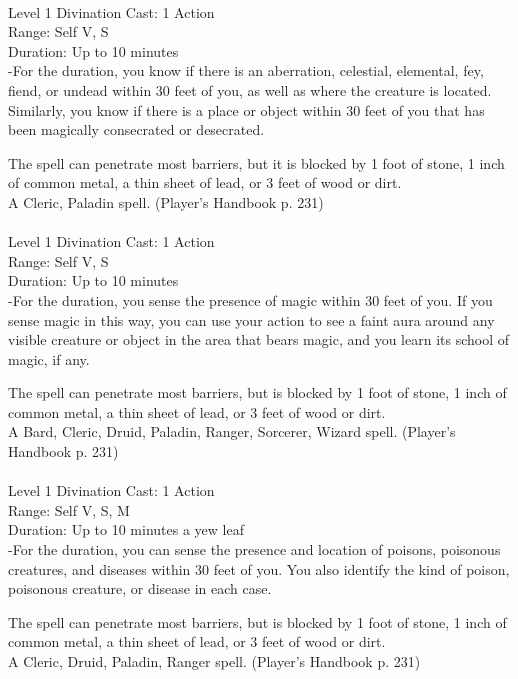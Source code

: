 \documentclass[10pt,twocolumn]{report}
\begin{document}
 \\
Level 1 \quad Divination \quad Cast: 1 Action\\
Range: Self \quad V, S\\
Duration: Up to 10 minutes \quad \\
-For the duration, you know if there is an aberration, celestial, elemental, fey, fiend, or undead within 30 feet of you, as well as where the creature is located. Similarly, you know if there is a place or object within 30 feet of you that has been magically consecrated or desecrated. 

The spell can penetrate most barriers, but it is blocked by 1 foot of stone, 1 inch of common metal, a thin sheet of lead, or 3 feet of wood or dirt.\\
A Cleric, Paladin spell. (Player's Handbook p. 231) \\


 \\
Level 1 \quad Divination \quad Cast: 1 Action\\
Range: Self \quad V, S\\
Duration: Up to 10 minutes \quad \\
-For the duration, you sense the presence of magic within 30 feet of you. If you sense magic in this way, you can use your action to see a faint aura around any visible creature or object in the area that bears magic, and you learn its school of magic, if any. 

The spell can penetrate most barriers, but is blocked by 1 foot of stone, 1 inch of common metal, a thin sheet of lead, or 3 feet of wood or dirt.\\
A Bard, Cleric, Druid, Paladin, Ranger, Sorcerer, Wizard spell. (Player's Handbook p. 231) \\


 \\
Level 1 \quad Divination \quad Cast: 1 Action\\
Range: Self \quad V, S, M \\
Duration: Up to 10 minutes \quad a yew leaf\\
-For the duration, you can sense the presence and location of poisons, poisonous creatures, and diseases within 30 feet of you. You also identify the kind of poison, poisonous creature, or disease in each case. 

The spell can penetrate most barriers, but is blocked by 1 foot of stone, 1 inch of common metal, a thin sheet of lead, or 3 feet of wood or dirt.\\
A Cleric, Druid, Paladin, Ranger spell. (Player's Handbook p. 231) \\
\end{document}
